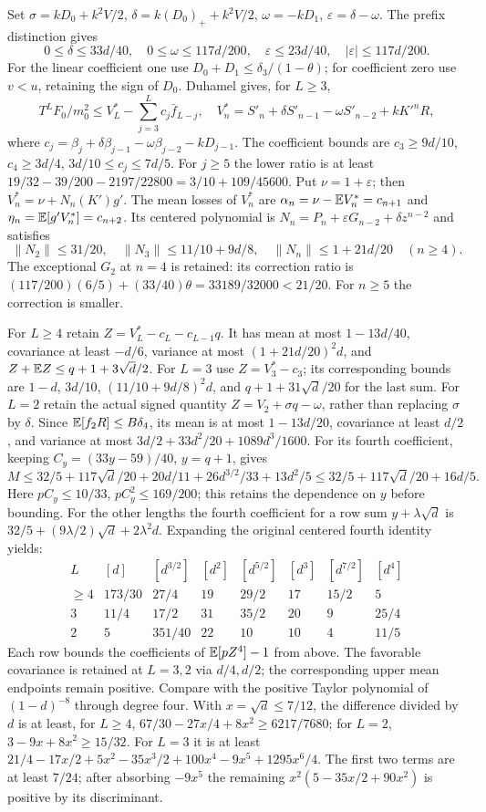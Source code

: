 Set $\sigma=kD_0+k^2V/2$,
$\delta=k(D_0)_++k^2V/2$, $\omega=-kD_1$, $\varepsilon=\delta-\omega$.
The prefix distinction gives
\[
 0\le\delta\le33d/40,\quad0\le\omega\le117d/200,
 \quad\varepsilon\le23d/40,\quad|\varepsilon|\le117d/200.
\]
For the linear coefficient one use $D_0+D_1\le \delta_{3}/(1-\theta)$;
for coefficient zero use $v<u$, retaining the sign of $D_0$.
Duhamel gives, for $L\ge3$,
\[
 T^LF_0/m_0^2\le V_L^*-\sum_{j=3}^Lc_j\bar f_{L-j},\quad
 V_n^*=S'_n+\delta S'_{n-1}-\omega S'_{n-2}+kK'^nR,
\]
where $c_j=\beta_j+\delta\beta_{j-1}-\omega\beta_{j-2}-kD_{j-1}$.
The coefficient bounds are
$c_3\ge9d/10$, $c_4\ge3d/4$, $3d/10\le c_j\le7d/5$.
For $j\ge5$ the lower ratio is at least
$19/32-39/200-2197/22800=3/10+109/45600$.
Put $\nu=1+\varepsilon$; then $V_n^*=\nu+N_n(K')g'$.
The mean losses of $V_n^*$ are
$\alpha_n=\nu-\mathbb E V_n^*=c_{n+1}$ and
$\eta_n=\mathbb E[g'V_n^*]=c_{n+2}$.
Its centered polynomial is
$N_n=P_n+\varepsilon G_{n-2}+\delta z^{n-2}$ and satisfies
\[
 \|N_2\|\le31/20,\quad\|N_3\|\le11/10+9d/8,
 \quad\|N_n\|\le1+21d/20\quad(n\ge4).
\]
The exceptional $G_2$ at $n=4$ is retained: its correction ratio is
$(117/200)(6/5)+(33/40)\theta=33189/32000<21/20$.
For $n\ge5$ the correction is smaller.

For $L\ge4$ retain $Z=V_L^*-c_L-c_{L-1}q$.
It has mean at most $1-13d/40$, covariance at least $-d/6$, variance
at most $(1+21d/20)^2d$, and
$Z+\mathbb E Z\le q+1+3\sqrt d/2$.
For $L=3$ use $Z=V_3^*-c_3$; its corresponding bounds are
$1-d$, $3d/10$, $(11/10+9d/8)^2d$, and
$q+1+31\sqrt d/20$ for the last sum.
For $L=2$ retain the actual signed quantity
$Z=V_2+\sigma q-\omega$, rather than replacing $\sigma$ by $\delta$.
Since $\mathbb E[f_2R]\le B\delta_{4}$, its mean is at most $1-13d/20$,
covariance at least $d/2$, and variance at most
$3d/2+33d^2/20+1089d^3/1600$.
For its fourth coefficient, keeping
$C_y=(33y-59)/40$, $y=q+1$, gives
\[
 M\le32/5+117\sqrt d/20+20d/11+26d^{3/2}/33+13d^2/5
 \le32/5+117\sqrt d/20+16d/5.
\]
Here $pC_y\le10/33$, $pC_y^2\le169/200$;
this retains the dependence on $y$ before bounding.
For the other lengths the fourth coefficient for a row sum
$y+\lambda\sqrt d$ is $32/5+(9\lambda/2)\sqrt d+2\lambda^2d$.
Expanding the original centered fourth identity yields:
\[
\begin{array}{c|rrrrrrr}
 L&[d]&[d^{3/2}]&[d^2]&[d^{5/2}]&[d^3]&[d^{7/2}]&[d^4]\\\hline
\ge4&173/30&27/4&19&29/2&17&15/2&5\\
3&11/4&17/2&31&35/2&20&9&25/4\\
2&5&351/40&22&10&10&4&11/5
\end{array}
\]
Each row bounds the coefficients of $\mathbb E[pZ^4]-1$ from above.
The favorable covariance is retained at $L=3,2$ via $d/4,d/2$;
the corresponding upper mean endpoints remain positive.
Compare with the positive Taylor polynomial of $(1-d)^{-8}$ through
degree four. With $x=\sqrt d\le7/12$, the difference divided by $d$
is at least, for $L\ge4$, $67/30-27x/4+8x^2\ge6217/7680$;
for $L=2$, $3-9x+8x^2\ge15/32$.
For $L=3$ it is at least
$21/4-17x/2+5x^2-35x^3/2+100x^4-9x^5+1295x^6/4$.
The first two terms are at least $7/24$; after absorbing $-9x^5$
the remaining $x^2(5-35x/2+90x^2)$ is positive by its discriminant.

